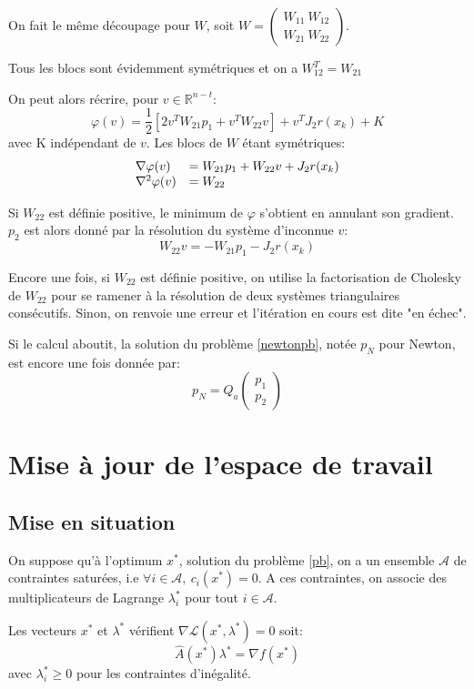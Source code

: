 \documentclass[a4paper,11pt]{article}
\newcommand{\real}{\mathbb{R}}
\newcommand{\ha}{\hat{A}}
\numberwithin{equation}{section}
\begin{document}
On fait le même découpage pour $W$, soit $W = \begin{pmatrix} W_{11}\ W_{12} \\ W_{21}\ W_{22} \end{pmatrix}$. 

Tous les blocs sont évidemment symétriques et on a $W_{12}^T = W_{21}$

On peut alors récrire, pour $v \in \real^{n-t}$: $$\varphi(v) = \dfrac{1}{2} \left[2v^TW_{21}p_1 + v^TW_{22}v\right] + v^TJ_2r(x_{k}) + K$$ avec K indépendant de $v$. Les blocs de $W$ étant symétriques:
$$ \begin{array}{l l}\nabla \varphi(v) &= W_{21}p_1 + W_{22}v + J_2r(x_{k}) \\
\nabla^2 \varphi(v) &= W_{22} \end{array}$$

Si $W_{22}$ est définie positive, le minimum de $\varphi$ s'obtient en annulant son gradient. $p_{2}$ est alors donné par la résolution du système d'inconnue $v$: $$W_{22}v = -W_{21}p_{1} -  J_2r(x_{k})$$ 

Encore une fois, si $W_{22}$ est définie positive, on utilise la factorisation de Cholesky de $W_{22}$ pour se ramener à la résolution de deux systèmes triangulaires consécutifs. Sinon, on renvoie une erreur et l'itération en cours est dite "en échec".

Si le calcul aboutit, la solution du problème \ref{newtonpb}, notée $p_{N}$ pour Newton, est encore une fois donnée par:
$$ p_{N} = Q_{a}\begin{pmatrix}p_{1}\\ p_{2} \end{pmatrix}$$


\section{Mise à jour de l'espace de travail} \label{working-set}

\subsection{Mise en situation}

On suppose qu'à l'optimum $x^{*}$, solution du problème \ref{pb}, on a 
un ensemble $\mathcal{A}$ de contraintes saturées, i.e $\forall i \in \mathcal{A},\ c_{i}(x^{*}) = 0$. A ces contraintes, on associe des multiplicateurs de Lagrange $\lambda^{*}_{i}$ pour tout $i\in \mathcal{A}$. 

Les vecteurs $x^{*}$ et $\lambda^{*}$ vérifient $\nabla \mathcal{L}(x^{*},\lambda^{*}) = 0$ soit:
\begin{equation} 
\ha(x^{*})\lambda^{*}=\nabla f(x^{*})
\end{equation}
avec $\lambda_{i}^{*}\geq0$ pour les contraintes d'inégalité. 
\end{document}

